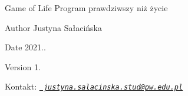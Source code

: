 \begin{DoxyParagraph}{Game of Life}
Program prawdziwszy niż życie 
\end{DoxyParagraph}
\begin{DoxyAuthor}{Author}
Justyna Sałacińska 
\end{DoxyAuthor}
\begin{DoxyDate}{Date}
2021.. 
\end{DoxyDate}
\begin{DoxyVersion}{Version}
1. 
\end{DoxyVersion}
\begin{DoxyParagraph}{Kontakt\+:}
{\itshape \href{mailto:justyna.salacinska.stud@pw.edu.pl}{\texttt{ justyna.\+salacinska.\+stud@pw.\+edu.\+pl}}} 
\end{DoxyParagraph}

